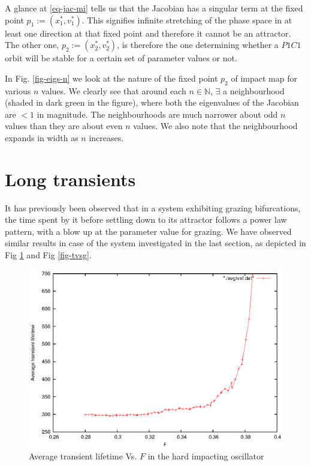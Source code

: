 \documentclass[oneside]{book}
\renewcommand{\(}{\begin{columns}}
\renewcommand{\)}{\end{columns}}
\newcommand{\<}[1]{\begin{column}{#1}}
\renewcommand{\>}{\end{column}}
\begin{document}
A glance at \eqref{eq-jac-mi} tells us that the Jacobian has a singular term 
at the fixed point $p_1:=(x_1^*,v_1^*)$.  This signifies infinite stretching of the 
phase space in at least one direction at that fixed point and therefore it 
cannot be an attractor.  The other one, $p_2:=(x_2^*,v_2^*)$, is therefore the one 
determining whether a $P1C1$ orbit will be stable for a certain set of 
parameter values or not.  


In Fig. \ref{fig-eigs-n} we look 
at the nature of the fixed point $p_2$ of impact map for various $n$ values. We clearly see that 
around each $n\in\mathbb{N}$, $\exists$ a neighbourhood (shaded in dark green 
in the figure), where both the eigenvalues of the Jacobian are $<1$ in 
magnitude.  The neighbourhoods are much narrower about odd $n$ values than 
they are about even $n$ values.   We also note that the neighbourhood expands 
in width as $n$ increases.  






\section{Long transients}
It has previously been observed that in a system exhibiting grazing 
bifurcations, the time spent by it before settling down to its attractor 
follows a power law pattern, with a blow up at the parameter value for 
grazing.  We have observed similar results in case of  the system investigated 
in the last section, as depicted in Fig \ref{fig-tvsf} and Fig \ref{fig-tvsg}. 

\begin{figure}[!htb]
\caption{Average transient lifetime Vs.  $F$ in the hard impacting oscillator}
\label{fig-tvsf}
\begin{center}
\includegraphics[width=0.7\columnwidth]{avgtauvsf-wofit}
\end{center}
\end{figure}
\end{document}
